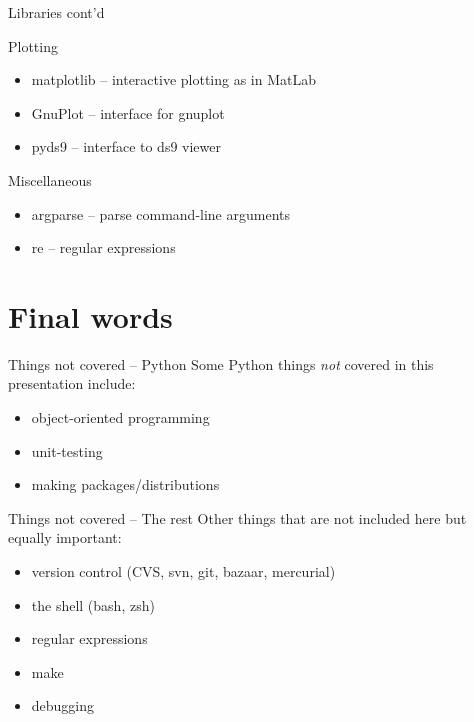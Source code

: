 \documentclass[xetex,10pt]{beamer}
\def\spacer{\vspace*{1em}}
\begin{document}
\begin{frame}[fragile]{Libraries cont'd}

Plotting
\begin{itemize}
\item matplotlib -- interactive plotting as in MatLab
\item GnuPlot -- interface for gnuplot
\item pyds9 -- interface to ds9 viewer
\end{itemize}

	\spacer

Miscellaneous
\begin{itemize}
\item argparse -- parse command-line arguments
\item re -- regular expressions
\end{itemize}

\end{frame}

\section{Final words}

\begin{frame}[fragile]{Things not covered -- Python}
	Some Python things \emph{not} covered in this presentation include:
	\spacer
	\begin{itemize}
		\item object-oriented programming
		\item unit-testing
		\item making packages/distributions
	\end{itemize}
\end{frame}

\begin{frame}[fragile]{Things not covered -- The rest}
	Other things that are not included here but equally important:
	\spacer
	\begin{itemize}
		\item version control (CVS, svn, git, bazaar, mercurial)
		\item the shell (bash, zsh)
		\item regular expressions
		\item make
		\item debugging
	\end{itemize}
\end{frame}
\end{document}

